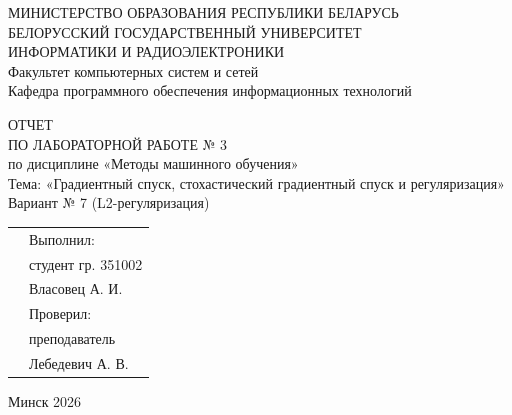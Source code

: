 \documentclass[14pt,a4paper]{extarticle}
\begin{document}
\begin{titlepage}
\thispagestyle{empty}
\begin{center}
  \fontsize{11pt}{13pt}\selectfont
  МИНИСТЕРСТВО ОБРАЗОВАНИЯ РЕСПУБЛИКИ БЕЛАРУСЬ\\
  БЕЛОРУССКИЙ ГОСУДАРСТВЕННЫЙ УНИВЕРСИТЕТ\\
  ИНФОРМАТИКИ И РАДИОЭЛЕКТРОНИКИ\\
  Факультет компьютерных систем и сетей\\
  Кафедра программного обеспечения информационных технологий
\end{center}

\vspace{55mm}

\begin{center}
  \fontsize{16pt}{20pt}\selectfont
  ОТЧЕТ\\
  ПО ЛАБОРАТОРНОЙ РАБОТЕ № 3\\[12pt]
  \fontsize{14pt}{18pt}\selectfont
  по дисциплине «Методы машинного обучения»\\[12pt]
  Тема: «Градиентный спуск, стохастический градиентный спуск и регуляризация»\\[6pt]
  Вариант № 7 (L2-регуляризация)
\end{center}

\vspace{45mm}

\noindent
\begin{tabularx}{\textwidth}{X p{75mm}}
  & Выполнил:\\
  & студент гр. 351002\\
  & Власовец А. И.\\[12pt]
  & Проверил:\\
  & преподаватель\\
  & Лебедевич А. В.
\end{tabularx}

\vfill

\begin{center}
  \fontsize{12pt}{14pt}\selectfont
  Минск 2026
\end{center}
\end{titlepage}

\newpage
\setcounter{page}{2}

\end{document}
